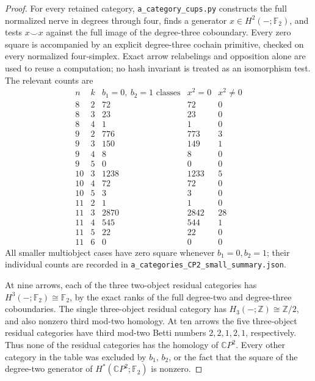 \begin{proof}
For every retained category, \texttt{a\_category\_cups.py} constructs
the full normalized nerve in degrees through four, finds a generator
$x\in H^2(-;\mathbb F_2)$, and tests $x\smile x$ against the full image
of the degree-three coboundary. Every zero square is accompanied by an
explicit degree-three cochain primitive, checked on every normalized
four-simplex. Exact arrow relabelings and opposition alone are used to
reuse a computation; no hash invariant is treated as an isomorphism
test. The relevant counts are
\[
\begin{array}{c|c|r|r|r}
 n&k&b_1=0,\ b_2=1\text{ classes}&x^2=0&x^2\ne0\\\hline
 8&2&72&72&0\\
 8&3&23&23&0\\
 8&4&1&1&0\\
 9&2&776&773&3\\
 9&3&150&149&1\\
 9&4&8&8&0\\
 9&5&0&0&0\\
 10&3&1238&1233&5\\
 10&4&72&72&0\\
 10&5&3&3&0\\
 11&2&1&1&0\\
 11&3&2870&2842&28\\
 11&4&545&544&1\\
 11&5&22&22&0\\
 11&6&0&0&0
\end{array}
\]
All smaller multiobject cases have zero square whenever $b_1=0,b_2=1$;
their individual counts are recorded in
\texttt{a\_categories\_CP2\_small\_summary.json}.

At nine arrows, each of the three two-object residual categories has
$H^3(-;\mathbb F_2)\cong\mathbb F_2$, by the exact ranks of the full
degree-two and degree-three coboundaries. The single three-object
residual category has $H_3(-;\mathbb Z)\cong\mathbb Z/2$, and also
nonzero third mod-two homology. At ten arrows the five three-object
residual categories have third mod-two Betti numbers
$2,2,1,2,1$, respectively. Thus none of the residual categories
has the homology of $\mathbb CP^2$. Every other category in the table was excluded
by $b_1$, $b_2$, or the fact that the square of the degree-two generator
of $H^*(\mathbb CP^2;\mathbb F_2)$ is nonzero.


\end{proof}
